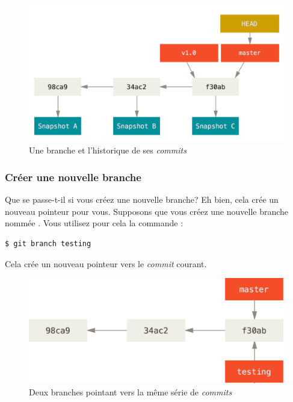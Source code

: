 \begin{figure}[!h]
  \centering
  \includegraphics{images/branch-and-history}
  \caption{Une branche et l'historique de ses \emph{commits}}
  \label{fig:git:branch-and-history}
\end{figure}

\subsubsection{Créer une nouvelle branche}
\label{sec:git:create_new_branch}

Que se passe-t-il si vous créez une nouvelle branche?
Eh bien, cela crée un nouveau pointeur pour vous.
Supposons que vous créez une nouvelle branche nommée .
Vous utilisez pour cela la commande :
\begin{Schunk}
\begin{Verbatim}
$ git branch testing
\end{Verbatim}
\end{Schunk}

Cela crée un nouveau pointeur vers le \emph{commit} courant.

\begin{figure}[!h]
  \centering
  \includegraphics{images/two-branches}
  \caption{Deux branches pointant vers la même série de \emph{commits}}
  \label{fig:git:two-branches}
\end{figure}

